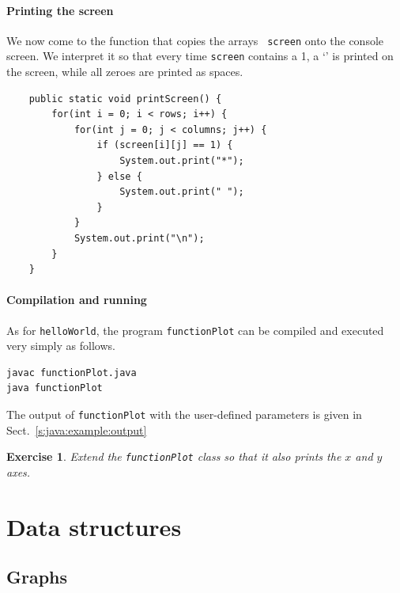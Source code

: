 \documentclass[a4paper]{book}
\theoremstyle{changebreak}                %
\newtheorem{ex}[result]{Exercise}
\begin{document}
\subsection{Printing the screen}
We now come to the function that copies the arrays {\tt
  screen} onto the console screen. We interpret it so
that every time {\tt screen} contains a 1, a `{\tt *}' is printed on
the screen, while all zeroes are printed as spaces.
\begin{verbatim}
    public static void printScreen() {
        for(int i = 0; i < rows; i++) {
            for(int j = 0; j < columns; j++) {
                if (screen[i][j] == 1) {
                    System.out.print("*");
                } else {
                    System.out.print(" ");
                }
            }
            System.out.print("\n");
        }
    }
\end{verbatim}

\subsection{Compilation and running}
As for {\tt helloWorld}, the program {\tt functionPlot} can be
compiled and executed very simply as follows.
\begin{verbatim}
javac functionPlot.java
java functionPlot
\end{verbatim}
The output of {\tt functionPlot} with the user-defined
parameters is given in Sect.~\ref{s:java:example:output}

\begin{ex}
Extend the {\tt functionPlot} class so that it also prints the $x$ and
$y$ axes.
\end{ex}


\part{Data structures}



\chapter{Graphs}
\label{c:graph}
\end{document}
